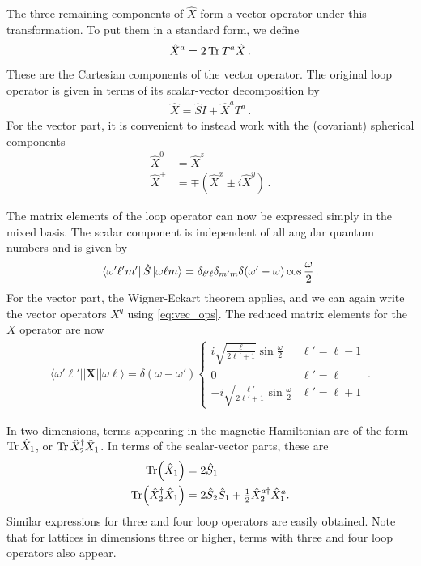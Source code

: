 \documentclass[reprint,superscriptaddress,pra,nofootinbib,preprintnumbers,floatfix]{revtex4-1}
\begin{document}
The three remaining components of $\hat{X}$ form a vector operator under this transformation. 
%
To put them in a standard form, we define
%
\begin{align}
    \hat{X}^a = 2 \Tr T^a \hat{X}
    \,.
\end{align}
%
These are the Cartesian components of the vector operator. 
%
The original loop operator is given in terms of its scalar-vector decomposition by
%
\begin{align}
    \hat{X} = \hat{S} I + \hat{X}^a T^a 
    \,.
\end{align}
%
For the vector part, it is convenient to instead work with the (covariant) spherical components
%
\begin{align}
    \hat{X}^0 &= \hat{X}^z \\
    \hat{X}^\pm &= \mp \left( \hat{X}^x \pm i \hat{X}^y \right)
    \,.
\end{align}

The matrix elements of the loop operator can now be expressed simply in the mixed basis. 
%
The scalar component is independent of all angular quantum numbers and is given by
%
\begin{align}\label{eq:scalar_mat_elements}
    \bra{\omega' \ell' m'}\hat{S}\ket{\omega \ell m} = \delta_{\ell'\ell}\delta_{m'm}\delta(\omega'-\omega) \cos\frac{\omega}{2}
    \,.
\end{align}
%
For the vector part, the Wigner-Eckart theorem applies, and we can again write the vector operators $X^q$ using \cref{eq:vec_ops}. 
%
The reduced matrix elements for the $X$ operator are now
%
\begin{align}\label{eq:mag_mat_elements}
    \langle \omega'\ell' \vert \vert \bm{X} \vert\vert \omega \ell \rangle = 
    \delta(\omega-\omega')\begin{cases}
    i \sqrt{\frac{\ell}{2\ell'+1}} \sin\frac{\omega}{2} & \ell' = \ell-1 \\
    0 & \ell' = \ell \\
    -i \sqrt{\frac{\ell'}{2\ell'+1}} \sin\frac{\omega}{2} & \ell'=\ell+1
    \end{cases}
    \,.
\end{align}

In two dimensions, terms appearing in the magnetic Hamiltonian are of the form $\Tr\hat{X}_1$, or $\Tr\hat{X}_2^\dagger \hat{X}_1$. 
%
In terms of the scalar-vector parts, these are
%
\begin{align}
    \Tr(\hat{X}_1) &= 2\hat{S}_1 \\
    \Tr(\hat{X}_2^\dagger \hat{X}_1) &= 2\hat S_2 \hat S_1 + \tfrac{1}{2}\hat{X}^{a\dagger}_2\hat{X}^a_1.
\end{align}
%
Similar expressions for three and four loop operators are easily obtained.
%
Note that for lattices in dimensions three or higher, terms with three and four loop operators also appear. 
\end{document}
